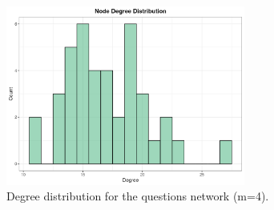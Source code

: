 \documentclass[11pt]{article}
\begin{document}
\begin{figure}[H]
  \centering
  \includegraphics[width=0.7\textwidth]{pc_degree_distribution_estudiante_questions_m4.png}
  \caption{Degree distribution for the questions network (m=4).}
\end{figure}
\end{document}
